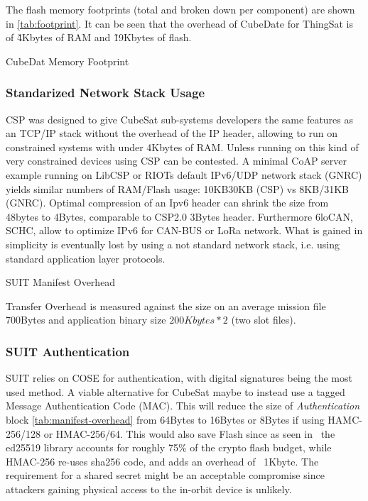 The flash memory footprints (total and broken down per component) are shown in
\ref*{tab:footprint}. It can be seen that the overhead of CubeDate for ThingSat
is of \~4Kbytes of RAM and \~19Kbytes of flash.

\begin{table}[ht]
    \caption{CubeDat Memory Footprint}
    \label{tab:footprint}
    \centering
    
\end{table}

\subsubsection{Standarized Network Stack Usage}

CSP was designed to give CubeSat sub-systems developers the same features as an
TCP/IP stack without the overhead of the IP header, allowing to run on constrained
systems with under 4Kbytes of RAM. Unless running on this kind of very constrained
devices using CSP can be contested. A minimal CoAP server example running on
LibCSP or RIOTs default IPv6/UDP network stack (GNRC) yields similar numbers of RAM/Flash
usage: 10KB\/30KB (CSP) vs 8KB/31KB (GNRC). Optimal compression of an Ipv6 header
can shrink the size from 48bytes to 4Bytes, comparable to CSP2.0 3Bytes header.
Furthermore  6loCAN\cite{wachter20206locan01}, SCHC\cite{rfc8724}, allow to
optimize IPv6 for CAN-BUS or LoRa network. What is gained in simplicity is eventually
lost by using a not standard network stack, i.e. using standard application
layer protocols.

\begin{table}[ht]
    \caption{SUIT Manifest Overhead}
    \label{tab:manifest-overhead}
    \centering
    
      \small Transfer Overhead is measured against the size on an average mission file
      700Bytes and application binary size \(200 Kbytes * 2\) (two slot files).
\end{table}

\subsubsection{SUIT Authentication}

SUIT relies on COSE for authentication, with digital signatures being the most
used method. A viable alternative for CubeSat maybe to instead use a tagged Message
Authentication Code (MAC). This will reduce the size of \textit{Authentication} block
\ref*{tab:manifest-overhead} from 64Bytes to 16Bytes or 8Bytes if using HAMC-256/128
or HMAC-256/64. This would also save Flash since as seen in~\cite{zandberg2019secure}
the ed25519 library accounts for roughly 75\% of the crypto flash budget, while HMAC-256
re-uses sha256 code, and adds an overhead of ~1Kbyte. The requirement for a shared secret
might be an acceptable compromise since attackers gaining physical access to the
in-orbit device is unlikely.

